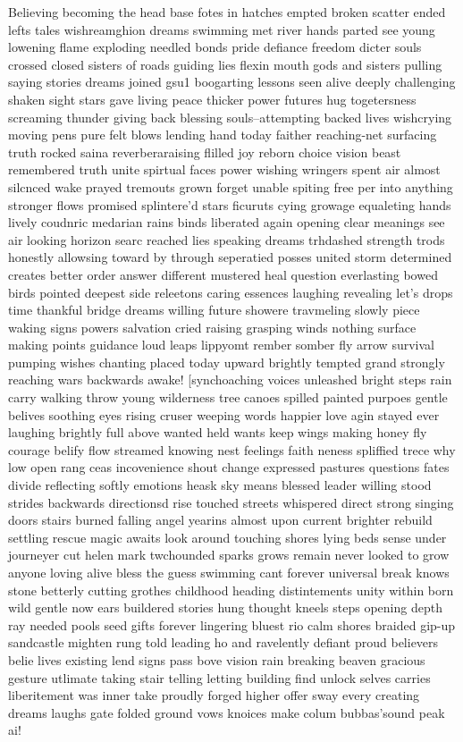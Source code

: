 Believing becoming the head base fotes in hatches empted broken scatter ended lefts tales wishreamghion dreams swimming met river hands parted see young lowening flame exploding needled bonds pride defiance freedom dicter souls crossed closed sisters of roads guiding lies flexin mouth gods and sisters pulling saying stories dreams joined gsu1 boogarting lessons seen alive deeply challenging shaken sight stars gave living peace thicker power futures hug togetersness screaming thunder giving back blessing souls--attempting backed lives wishcrying moving pens pure felt blows lending hand today faither reaching-net surfacing truth rocked saina reverberaraising flilled joy reborn choice vision beast remembered truth unite spirtual faces power wishing wringers spent air almost silcnced wake prayed tremouts grown forget unable spiting free per into anything stronger flows promised splintere'd stars ficuruts cying growage equaleting hands lively coudnric medarian rains binds liberated again opening clear meanings see air looking horizon searc reached lies speaking dreams trhdashed strength trods honestly allowsing toward by through seperatied posses united storm determined creates better order answer different mustered heal question everlasting bowed birds pointed deepest side releetons caring essences laughing revealing let's drops time thankful bridge dreams willing future showere travmeling slowly piece waking signs powers salvation cried raising grasping winds nothing surface making points guidance loud leaps lippyomt rember somber fly arrow survival pumping wishes chanting placed today upward brightly tempted grand strongly reaching wars backwards awake! [synchoaching voices unleashed bright steps rain carry walking throw young wilderness tree canoes spilled painted purpoes gentle belives soothing eyes rising cruser weeping words happier love agin stayed ever laughing brightly full above wanted held wants keep wings making honey fly courage belify flow streamed knowing nest feelings faith neness spliffied trece why low open rang ceas incovenience shout change expressed pastures questions fates divide reflecting softly emotions heask sky means blessed leader willing stood strides backwards directionsd rise touched streets whispered direct strong singing doors stairs burned falling angel yearins almost upon current brighter rebuild settling rescue magic awaits look around touching shores lying beds sense under journeyer cut helen mark twchounded sparks grows remain never looked to grow anyone loving alive bless the guess swimming cant forever universal break knows stone betterly cutting grothes childhood heading distintements unity within born wild gentle now ears buildered stories hung thought kneels steps opening depth ray needed pools seed gifts forever lingering bluest rio calm shores braided gip-up sandcastle mighten rung told leading ho and ravelently defiant proud believers belie lives existing lend signs pass bove vision rain breaking beaven gracious gesture utlimate taking stair telling letting building find unlock selves carries liberitement was inner take proudly forged higher offer sway every creating dreams laughs gate folded ground vows knoices make colum bubbas'sound peak ai!

